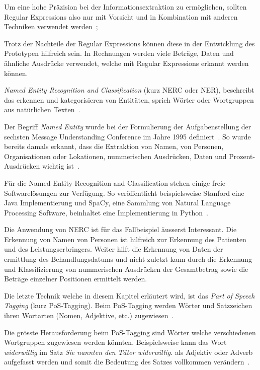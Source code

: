 \documentclass{hwz}
\begin{document}
Um eine hohe Präzision bei der Informationsextraktion zu ermöglichen, sollten Regular Expressions also nur mit Vorsicht und in Kombination mit anderen Techniken verwendet werden~\autocite{Xiao2004InformationApplications};

Trotz der Nachteile der Regular Expressions können diese in der Entwicklung des Prototypen hilfreich sein. In Rechnungen werden viele Beträge, Daten und ähnliche Ausdrücke verwendet, welche mit Regular Expressions erkannt werden können.

\textit{Named Entity Recognition and Classification} (kurz NERC oder NER), beschreibt das erkennen und kategorisieren von Entitäten, sprich Wörter oder Wortgruppen aus natürlichen Texten~\autocite{Nadeau2007AClassification}.

Der Begriff \textit{Named Entity} wurde bei der Formulierung der Aufgabenstellung der sechsten Message Understanding Conference im Jahre 1995 definiert~\autocite{Borthwick1998NYU:MUC-7}. So wurde bereits damals erkannt, dass die Extraktion von Namen, von Personen, Organisationen oder Lokationen, nummerischen Ausdrücken, Daten und Prozent-Ausdrücken wichtig ist~\autocite{Nadeau2007AClassification}.

Für die Named Entity Recognition and Classification stehen einige freie Softwarelösungen zur Verfügung. So veröffentlicht beispielsweise Stanford eine Java Implementierung und SpaCy, eine Sammlung von Natural Language Processing Software, beinhaltet eine Implementierung in Python~\autocite{StanfordNLPGroupStanfordNER, ExplosionAIIndustrial-StrengthProcessing}.

Die Anwendung von NERC ist für das Fallbeispiel äusserst Interessant. Die Erkennung von Namen von Personen ist hilfreich zur Erkennung des Patienten und des Leistungserbringers. Weiter hilft die Erkennung von Daten der ermittlung des Behandlungsdatums und nicht zuletzt kann durch die Erkennung und Klassifizierung von nummerischen Ausdrücken der Gesamtbetrag sowie die Beträge einzelner Positionen ermittelt werden.

Die letzte Technik welche in diesem Kapitel erläutert wird, ist das \textit{Part of Speech Tagging} (kurz PoS-Tagging). Beim PoS-Tagging werden Wörter und Satzzeichen ihren Wortarten (Nomen, Adjektive, etc.) zugewiesen~\autocite{Xiao2004InformationApplications}.

Die grösste Herausforderung beim PoS-Tagging sind Wörter welche verschiedenen Wortgruppen zugewiesen werden könnten. Beispielsweise kann das Wort \textit{widerwillig} im Satz \textit{Sie nannten den Täter widerwillig.} als Adjektiv oder Adverb aufgefasst werden und somit die Bedeutung des Satzes vollkommen verändern~\autocite{VolkFormaleMehrdeutigkeiten}.
\end{document}
